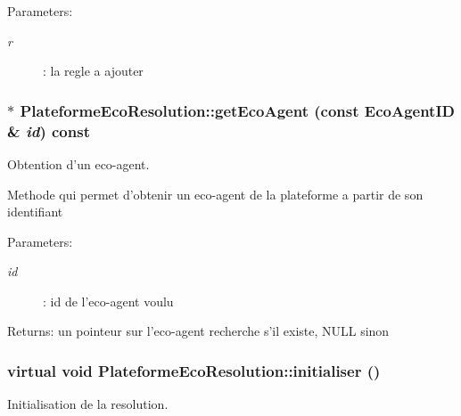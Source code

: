 \begin{Desc}
\item[Parameters:]
\begin{description}
\item[{\em r}]: la regle a ajouter \end{description}
\end{Desc}
\hypertarget{classPlateformeEcoResolution_ba320298b5b660cb2dff0558f8c5eb31}{
\subsubsection[{getEcoAgent}]{$\ast$ PlateformeEcoResolution::getEcoAgent (const {\bf EcoAgentID} \& {\em id}) const}}
\label{classPlateformeEcoResolution_ba320298b5b660cb2dff0558f8c5eb31}


Obtention d'un eco-agent. 

Methode qui permet d'obtenir un eco-agent de la plateforme a partir de son identifiant

\begin{Desc}
\item[Parameters:]
\begin{description}
\item[{\em id}]: id de l'eco-agent voulu \end{description}
\end{Desc}
\begin{Desc}
\item[Returns:]un pointeur sur l'eco-agent recherche s'il existe, NULL sinon \end{Desc}
\hypertarget{classPlateformeEcoResolution_57d87139f09ca51cd6a4fa7cd2e83351}{
\subsubsection[{initialiser}]{\setlength{\rightskip}{0pt plus 5cm}virtual void PlateformeEcoResolution::initialiser ()}}
\label{classPlateformeEcoResolution_57d87139f09ca51cd6a4fa7cd2e83351}


Initialisation de la resolution. 

